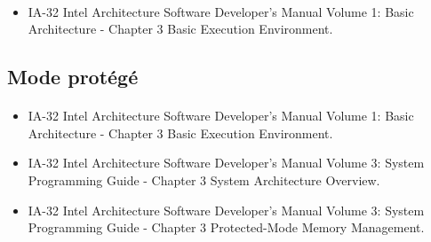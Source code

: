\documentclass[10pt,a4wide]{article}
\begin{document}
\paragraph{}

\begin{itemize}
\item IA-32 Intel Architecture Software Developer's Manual Volume 1:
      Basic Architecture - Chapter 3 Basic Execution Environment.
\end{itemize}

\subsection{Mode prot\'eg\'e}

\paragraph{}

\begin{itemize}
\item IA-32 Intel Architecture Software Developer's Manual Volume 1:
      Basic Architecture - Chapter 3 Basic Execution Environment.
\item IA-32 Intel Architecture Software Developer's Manual Volume 3:
      System Programming Guide - Chapter 3 System Architecture Overview.
\item IA-32 Intel Architecture Software Developer's Manual Volume 3:
      System Programming Guide - Chapter 3 Protected-Mode Memory Management.
\end{itemize}
\end{document}

